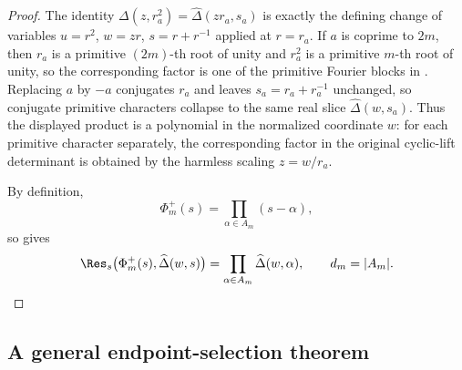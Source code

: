 \begin{proof}
The identity
\(\Delta(z,r_a^2)=\widehat\Delta(zr_a,s_a)\) is exactly the defining
change of variables \(u=r^2\), \(w=zr\), \(s=r+r^{-1}\) applied at
\(r=r_a\). If \(a\) is coprime to \(2m\), then \(r_a\) is a primitive
\((2m)\)-th root of unity and \(r_a^2\) is a primitive \(m\)-th root of
unity, so the corresponding factor is one of the primitive Fourier
blocks in . Replacing \(a\) by
\(-a\) conjugates \(r_a\) and leaves \(s_a=r_a+r_a^{-1}\) unchanged, so
conjugate primitive characters collapse to the same real slice
\(\widehat\Delta(w,s_a)\). Thus the displayed product is a polynomial in
the normalized coordinate \(w\): for each primitive character separately,
the corresponding factor in the original cyclic-lift determinant is
obtained by the harmless scaling \(z=w/r_a\).

By definition,
\[
  \Phi_m^+(s)=\prod_{\alpha\in A_m}(s-\alpha),
\]
so  gives
\[
  \Res_s\bigl(\Phi_m^+(s),\widehat\Delta(w,s)\bigr)
  =
    \prod_{\alpha\in A_m}\widehat\Delta(w,\alpha),
  \qquad d_m=|A_m|.
\]
\end{proof}

\subsection{A general endpoint-selection theorem}

